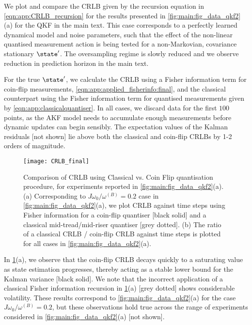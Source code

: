 We plot and compare the CRLB given by the recursion equation in \cref{eqn:app:CRLB_recursion} for the results presented in \cref{fig:main:fig_data_qkf2}(a)  for the QKF in the main text. This case corresponds to a perfectly learned dynamical model and noise parameters, such that the effect of the non-linear quantised measurement action is being tested for a non-Markovian, covariance stationary $\state'$. The oversampling regime is slowly reduced and we observe reduction in prediction horizon in the main text. 

For the true $\state'$, we calculate the CRLB using a Fisher information term for coin-flip measurements, \cref{eqn:app:applied_fisherinfo:final}, and the classical counterpart using the Fisher information term for quantised measurements given by \cref{eqn:app:classicalquantiser}. In all cases, we discard data for the first $100$ points, as the AKF model needs to accumulate enough measurements before dynamic updates can begin sensibly. The expectation values of the Kalman residuals [not shown] lie above both the classical and coin-flip CRLBs by 1-2 orders of magnitude. 

\begin{figure}[h!]
	\texttt{[image: CRLB\_final]} 
	\caption{ \label{fig:app:CRLB} Comparison of CRLB using Classical vs. Coin Flip quantisation procedure, for experiments reported in \cref{fig:main:fig_data_qkf2}(a). (a) Corresponding to $J\omega_0 / \omega^{(B)} = 0.2$ case in  \cref{fig:main:fig_data_qkf2}(a), we plot CRLB against time steps using Fisher information for a coin-flip quantiser [black solid] and a classical mid-tread/mid-riser quantiser [grey dotted]. (b) The ratio of a classical CRLB / coin-flip CRLB against time steps is plotted for all cases in \cref{fig:main:fig_data_qkf2}(a).}
\end{figure}
\FloatBarrier

In \cref{fig:app:CRLB}(a), we observe that the coin-flip CRLB decays quickly to a saturating value as state estimation progresses, thereby acting as a stable lower bound for the Kalman variance [black solid]. We note that the incorrect application of a classical Fisher information recursion in \cref{fig:app:CRLB}(a) [grey dotted] shows considerable volatility. These results correspond to 
\cref{fig:main:fig_data_qkf2}(a) for the case $J\omega_0 / \omega^{(B)} = 0.2$, but these observations hold true across the range of experiments considered in \cref{fig:main:fig_data_qkf2}(a) [not shown].

